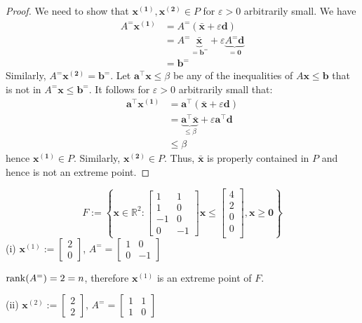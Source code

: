 \begin{proof}
We need to show that $ \bm{x^{(1)}},\bm{x^{(2)}}\in P $
for  $ \varepsilon > 0 $ arbitrarily small. We have
\begin{align*}
    A^= \bm{x^{(1)}}&=A^=(\bm{\bar{x}} + \varepsilon \bm{d})\\
    &=A^= \underbrace{\bm{\bar{x}}}_{=\bm{b^=}}
    +\varepsilon\underbrace{A^= \bm{d}}_{=\bm{0}}\\
    &=\bm{b^=}
\end{align*}
Similarly, $ A^= \bm{x^{(2)}}= \bm{b^=}$. Let $ \bm{a}^\top \bm{x}\le \beta $
be any of the inequalities of $ A \bm{x}\le \bm{b} $ that is not in
$ A^= \bm{x}\le \bm{b}^= $. 
It follows for $ \varepsilon >0 $ arbitrarily small that:
\begin{align*}
    \bm{a}^\top \bm{x^{(1)}}&= \bm{a}^\top(\bm{\bar{x}} + \varepsilon \bm{d})\\
    &=\underbrace{\bm{a}^\top \bm{\bar{x}}}_{\le \beta}+
    \varepsilon \bm{a}^\top \bm{d}\\
    &\le \beta
\end{align*}
hence $ \bm{x^{(1)}}\in P $. Similarly, $ \bm{x^{(2)}}\in P $. Thus, 
$ \bm{\bar{x}} $ is properly contained in $ P $ and hence is not
an extreme point.
\end{proof}


\[ F:=\left\{ \bm{x}\in\mathbb{R}^2: \begin{bmatrix}
    1 & 1\\
    1 & 0\\
    -1 & 0\\
    0 & -1
\end{bmatrix}\bm{x}\le
\begin{bmatrix}
    4\\
    2\\
    0\\
    0\\
\end{bmatrix}, \bm{x}\ge \bm{0} \right\} \]
(i) 
$\bm{x}^{(1)}:=\begin{bmatrix}2\\0\end{bmatrix}$,
$ A^= =
\begin{bmatrix}
    1 & 0\\
    0 & -1
\end{bmatrix} $

$ \operatorname{rank}(A^=)=2=n $, therefore $\bm{x}^{(1)}$ is an extreme
point of $ F $.

(ii)
$\bm{x}^{(2)}:=\begin{bmatrix}2\\2\end{bmatrix}$,
$ A^= =
\begin{bmatrix}
    1 & 1\\
    1 & 0
\end{bmatrix} $

